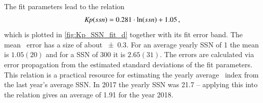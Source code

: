 The fit parameters lead to the relation
\begin{align}
	\textit{Kp}(ssn) = 0.281 \cdot \ln(ssn) + 1.05	\,,	\label{eq:kp_ssn_relation}
\end{align}
which is plotted in \autoref{fig:Kp_SSN_fit_d} together with its fit error band. The mean \Kp~error has a size of about \num{+-0.3}. For an average yearly SSN of 1 the mean \Kp{} is $1.05(20)$ and for a SSN of 300 it is $2.65(31)$. The errors are calculated via error propagation from the estimated standard deviations of the fit parameters.
This relation is a practical resource for estimating the yearly average \Kp~index from the last year's average SSN. In 2017 the yearly SSN was \num{21.7} -- applying this into the relation gives an average \Kp{} of \num{1.91} for the year 2018.

